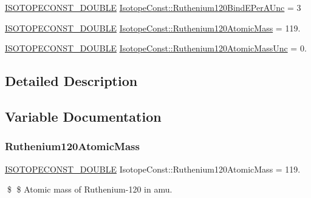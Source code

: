 \begin{DoxyCompactItemize}
\mbox{\hyperlink{group___isotope_const-_macros_ga8f45a7272ce02c0b4c65c44636ed719a}{I\+S\+O\+T\+O\+P\+E\+C\+O\+N\+S\+T\+\_\+\+D\+O\+U\+B\+LE}} \mbox{\hyperlink{group___isotope_const-_ruthenium-_ru120_ga91540f82a409935923a3f007872805d0}{Isotope\+Const\+::\+Ruthenium120\+Bind\+E\+Per\+A\+Unc}} = 3
\item 
\mbox{\hyperlink{group___isotope_const-_macros_ga8f45a7272ce02c0b4c65c44636ed719a}{I\+S\+O\+T\+O\+P\+E\+C\+O\+N\+S\+T\+\_\+\+D\+O\+U\+B\+LE}} \mbox{\hyperlink{group___isotope_const-_ruthenium-_ru120_ga924939d6453049b0724832b4895ac340}{Isotope\+Const\+::\+Ruthenium120\+Atomic\+Mass}} = 119.
\item 
\mbox{\hyperlink{group___isotope_const-_macros_ga8f45a7272ce02c0b4c65c44636ed719a}{I\+S\+O\+T\+O\+P\+E\+C\+O\+N\+S\+T\+\_\+\+D\+O\+U\+B\+LE}} \mbox{\hyperlink{group___isotope_const-_ruthenium-_ru120_ga92b2e2e25f1395a2d33218f484036aa0}{Isotope\+Const\+::\+Ruthenium120\+Atomic\+Mass\+Unc}} = 0.
\end{DoxyCompactItemize}


\subsection{Detailed Description}


\subsection{Variable Documentation}
\mbox{\label{group___isotope_const-_ruthenium-_ru120_ga924939d6453049b0724832b4895ac340}} 
\subsubsection{\texorpdfstring{Ruthenium120\+Atomic\+Mass}{Ruthenium120AtomicMass}}
{\footnotesize\ttfamily \mbox{\hyperlink{group___isotope_const-_macros_ga8f45a7272ce02c0b4c65c44636ed719a}{I\+S\+O\+T\+O\+P\+E\+C\+O\+N\+S\+T\+\_\+\+D\+O\+U\+B\+LE}} Isotope\+Const\+::\+Ruthenium120\+Atomic\+Mass = 119.}

\$ \$ Atomic mass of Ruthenium-\/120 in amu. \mbox{\label{group___isotope_const-_ruthenium-_ru120_ga92b2e2e25f1395a2d33218f484036aa0}} 
